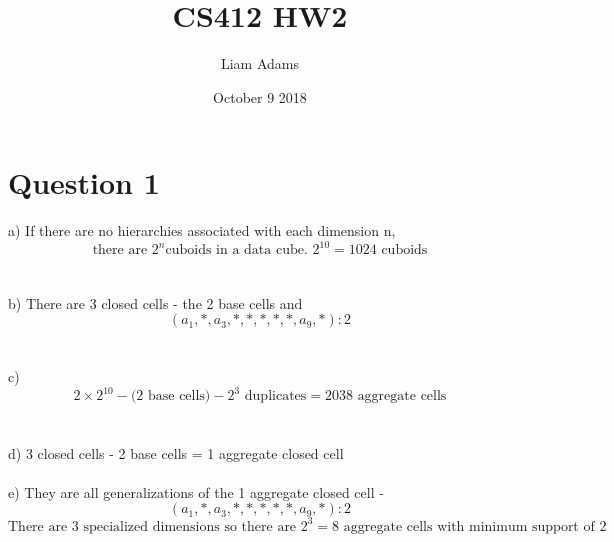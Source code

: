 \documentclass{article}
\title{CS412 HW2}
\author{Liam Adams }
\date{October 9 2018}
\begin{document}
\maketitle

\section{Question 1}
a) If there are no hierarchies associated with each dimension n, $$\text{there are }2^n \text{cuboids in a data cube. }2^{10}=1024\text{ cuboids}$$\\\\
b) There are 3 closed cells - the 2 base cells and $$(a_1,*,a_3,*,*,*,*,*,a_9,*):2$$\\\\
c)$$2\times2^{10} - \text{(2 base cells)} - 2^3\text{ duplicates} = 2038 \text{ aggregate cells}$$\\\\
d) 3 closed cells - 2 base cells = 1 aggregate closed cell\\\\
e) They are all generalizations of the 1 aggregate closed cell - $$(a_1,*,a_3,*,*,*,*,*,a_9,*):2$$  $$\text{There are 3 specialized dimensions so there are }2^3 = 8\text{ aggregate cells with minimum support of 2}$$\\
\end{document}
